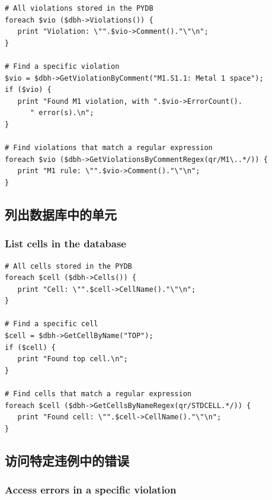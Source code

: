 \begin{lstlisting}
# All violations stored in the PYDB
foreach $vio ($dbh->Violations()) {
   print "Violation: \"".$vio->Comment()."\"\n";
}

# Find a specific violation
$vio = $dbh->GetViolationByComment("M1.S1.1: Metal 1 space");
if ($vio) {
   print "Found M1 violation, with ".$vio->ErrorCount().
      " error(s).\n";
}

# Find violations that match a regular expression
foreach $vio ($dbh->GetViolationsByCommentRegex(qr/M1\..*/)) {
   print "M1 rule: \"".$vio->Comment()."\"\n";
}
\end{lstlisting}

\subsection{列出数据库中的单元}
\subsubsection*{List cells in the database}

\begin{lstlisting}
# All cells stored in the PYDB
foreach $cell ($dbh->Cells()) {
   print "Cell: \"".$cell->CellName()."\"\n";
}

# Find a specific cell
$cell = $dbh->GetCellByName("TOP");
if ($cell) {
   print "Found top cell.\n";
}

# Find cells that match a regular expression
foreach $cell ($dbh->GetCellsByNameRegex(qr/STDCELL.*/)) {
   print "Found cell: \"".$cell->CellName()."\"\n";
}
\end{lstlisting}

\subsection{访问特定违例中的错误}
\subsubsection*{Access errors in a specific violation}

